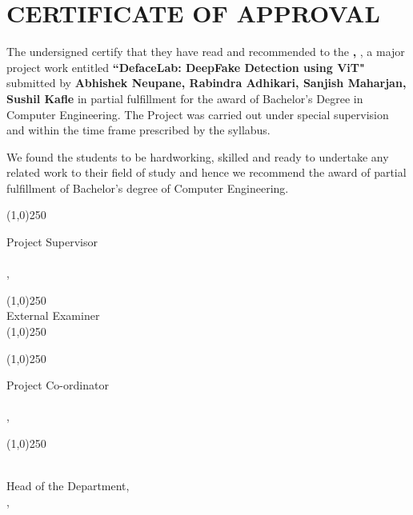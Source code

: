 \section*{CERTIFICATE OF APPROVAL}


The undersigned certify that they have read and recommended to the \textbf{\thedepartment,  \thecampus}, a major
project work entitled \textbf{“DefaceLab:  DeepFake Detection using ViT"} submitted by \textbf{Abhishek Neupane, Rabindra Adhikari, Sanjish Maharjan, Sushil Kafle} in partial fulfillment for the award of Bachelor’s
Degree in Computer Engineering. The Project was carried out
under special supervision and within the time frame prescribed by the syllabus.

\vspace{0.7cm}

\noindent We found the students to be hardworking, skilled and ready to undertake any related
work to their field of study and hence we recommend the award of partial fulfillment
of Bachelor’s degree of Computer Engineering.

\vspace{0.7cm}

\noindent \line(1,0){250}

\noindent Project Supervisor \\
\thesupervisor \\
\thedepartment, \thecampus


\vspace{0.5cm}
\noindent \line(1,0){250}\\
\noindent External Examiner \\

\noindent \line(1,0){250}\\

\vspace{0.3cm}

\noindent \line(1,0){250}

\noindent Project Co-ordinator \\
\theprogramcoordinator \\
\thedepartment, \thecampus

\vspace{0.4cm}

\noindent \line(1,0){250}

\noindent \theHOD \\
Head of the Department, \\
\thedepartment, \thecampus

\vspace{0.3cm}

\noindent \thedate
